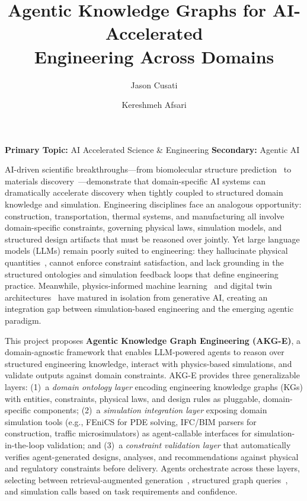\documentclass[conference, 10pt]{IEEEtran}
\title{Agentic Knowledge Graphs for AI-Accelerated\\Engineering Across Domains}
\author{Jason Cusati \and Kereshmeh Afsari}
\date{}
\begin{document}
\maketitle
\thispagestyle{empty}

\vspace{-1.5em}

\noindent\textbf{Primary Topic:} AI Accelerated Science \& Engineering \hfill
\textbf{Secondary:} Agentic AI

\vspace{0.5em}

AI-driven scientific breakthroughs---from biomolecular structure prediction~\cite{Abramson2024AlphaFold3} to materials discovery~\cite{Merchant2023GNoME}---demonstrate that domain-specific AI systems can dramatically accelerate discovery when tightly coupled to structured domain knowledge and simulation. Engineering disciplines face an analogous opportunity: construction, transportation, thermal systems, and manufacturing all involve domain-specific constraints, governing physical laws, simulation models, and structured design artifacts that must be reasoned over jointly. Yet large language models (LLMs) remain poorly suited to engineering: they hallucinate physical quantities~\cite{Ji2023HallucinationSurvey}, cannot enforce constraint satisfaction, and lack grounding in the structured ontologies and simulation feedback loops that define engineering practice. Meanwhile, physics-informed machine learning~\cite{Karniadakis2021PINN} and digital twin architectures~\cite{Tao2019DigitalTwin} have matured in isolation from generative AI, creating an integration gap between simulation-based engineering and the emerging agentic paradigm.

This project proposes \textbf{Agentic Knowledge Graph Engineering (AKG-E)}, a domain-agnostic framework that enables LLM-powered agents to reason over structured engineering knowledge, interact with physics-based simulations, and validate outputs against domain constraints. AKG-E provides three generalizable layers: (1)~a \textit{domain ontology layer} encoding engineering knowledge graphs (KGs) with entities, constraints, physical laws, and design rules as pluggable, domain-specific components; (2)~a \textit{simulation integration layer} exposing domain simulation tools (e.g., FEniCS for PDE solving, IFC/BIM parsers for construction, traffic microsimulators) as agent-callable interfaces for simulation-in-the-loop validation; and (3)~a \textit{constraint validation layer} that automatically verifies agent-generated designs, analyses, and recommendations against physical and regulatory constraints before delivery. Agents orchestrate across these layers, selecting between retrieval-augmented generation~\cite{Lewis2020RAG}, structured graph queries~\cite{Edge2024GraphRAG}, and simulation calls based on task requirements and confidence.
\end{document}
